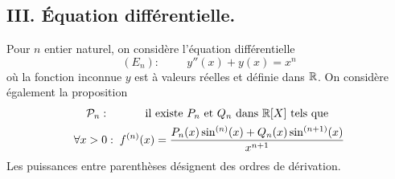 \subsection*{III. \'Equation différentielle.}
Pour $n$ entier naturel, on considère l'équation différentielle
\begin{displaymath}
  (E_n):\hspace{1cm} y''(x) + y(x) = x^n
\end{displaymath}
où la fonction inconnue $y$ est à valeurs réelles et définie dans $\mathbb{R}$.\newline
On considère également la proposition
\begin{multline*}
  \mathcal{P}_n:\hspace{1cm} \text{ il existe } P_n \text{ et } Q_n \text{ dans } \mathbb{R}[X] \text{ tels que }\\
  \forall x>0:\;f^{(n)}(x)=\frac{P_n(x)\sin^{(n)}(x) + Q_n(x)\sin^{(n+1)}(x)}{x^{n+1}}
\end{multline*}
Les puissances entre parenthèses désignent des ordres de dérivation.
